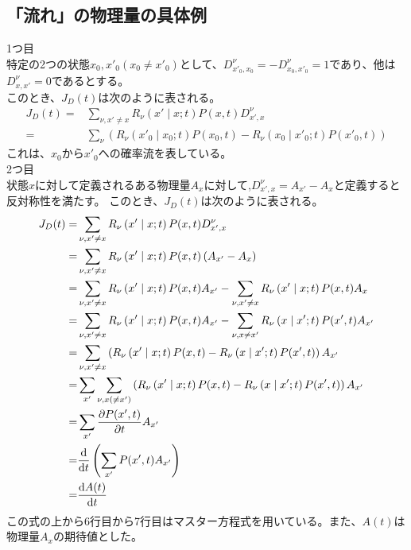 \documentclass{ltjsarticle}
\begin{document}
\subsection{「流れ」の物理量の具体例}
1つ目\\
特定の2つの状態$x_0,x'_0(x_0\neq x'_0)$として、$D^{\nu}_{x'_0,x_0}=-D^{\nu}_{x_0,x'_0}=1$であり、他は$D^{\nu}_{x,x'}=0$であるとする。\\
このとき、$J_D(t)$は次のように表される。
\begin{align}
  J_D(t)=&\sum_{\nu,x'\neq x}R_{\nu}\left(x'\mid x;t\right)P(x,t)D^{\nu}_{x',x}\\
  =&\sum_\nu\left( R_{\nu}\left(x'_0\mid x_0;t\right)P(x_0,t)-R_{\nu}\left(x_0\mid x'_0;t\right)P(x'_0,t) \right)
\end{align}
これは、$x_0$から$x'_0$への確率流を表している。\\
2つ目\\
状態$x$に対して定義されるある物理量$A_x$に対して,$D^\nu_{x',x}=A_{x'}-A_x$と定義すると反対称性を満たす。
このとき、$J_D(t)$は次のように表される。
\begin{align}
  J_D(t)=&\sum_{\nu,x'\neq x}R_{\nu}\left(x'\mid x;t\right)P(x,t)D^{\nu}_{x',x}\\
  =&\sum_{\nu,x'\neq x}R_{\nu}\left(x'\mid x;t\right)P(x,t)\left( A_{x'}-A_x \right) \\
  =&\sum_{\nu,x'\neq x}R_{\nu}\left(x'\mid x;t\right)P(x,t)A_{x'}-\sum_{\nu,x'\neq x}R_{\nu}\left(x'\mid x;t\right)P(x,t)A_x \\
  =&\sum_{\nu,x'\neq x}R_{\nu}\left(x'\mid x;t\right)P(x,t)A_{x'}-\sum_{\nu,x\neq x'}R_{\nu}\left(x\mid x';t\right)P(x',t)A_{x'} \\
  =&\sum_{\nu,x'\neq x}\left( R_{\nu}\left(x'\mid x;t\right)P(x,t)- R_{\nu}\left(x\mid x';t\right)P(x',t)\right) A_{x'}\\
  =&\sum_{x'}\sum_{\nu,x(\neq x')}\left( R_{\nu}\left(x'\mid x;t\right)P(x,t)- R_{\nu}\left(x\mid x';t\right)P(x',t)\right) A_{x'}\\
  =&\sum_{x'}\pdv{P(x',t)}{t}A_{x'}\\
  =&\dv{t}\left( \sum_{x'}P(x',t)A_{x'} \right) \\
  =&\dv{A(t)}{t}
\end{align}
この式の上から6行目から7行目はマスター方程式を用いている。また、$A(t)$は物理量$A_x$の期待値とした。\\
\end{document}
